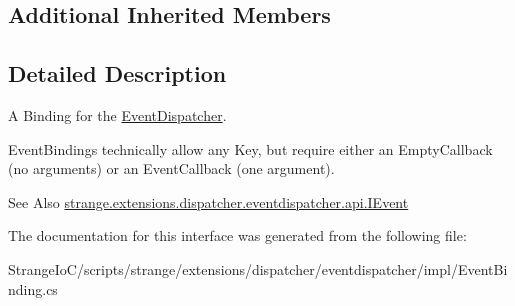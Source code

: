 \subsection*{Additional Inherited Members}


\subsection{Detailed Description}
A Binding for the \hyperlink{classstrange_1_1extensions_1_1dispatcher_1_1eventdispatcher_1_1impl_1_1_event_dispatcher}{Event\-Dispatcher}. 

Event\-Bindings technically allow any Key, but require either an Empty\-Callback (no arguments) or an Event\-Callback (one argument).

\begin{DoxySeeAlso}{See Also}
\hyperlink{interfacestrange_1_1extensions_1_1dispatcher_1_1eventdispatcher_1_1api_1_1_i_event}{strange.\-extensions.\-dispatcher.\-eventdispatcher.\-api.\-I\-Event} 
\end{DoxySeeAlso}


The documentation for this interface was generated from the following file\-:\begin{DoxyCompactItemize}
\item 
Strange\-Io\-C/scripts/strange/extensions/dispatcher/eventdispatcher/impl/Event\-Binding.\-cs\end{DoxyCompactItemize}
